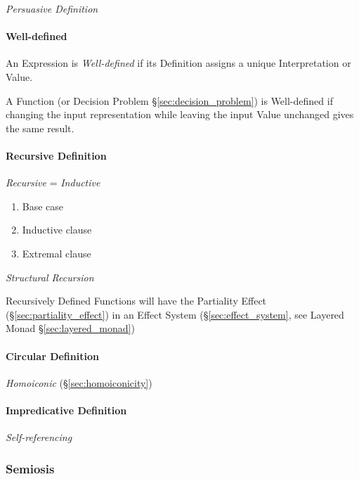 \emph{Persuasive Definition}



\paragraph{Well-defined}\label{sec:well_defined}\hfill

An Expression is \emph{Well-defined} if its Definition assigns a
unique Interpretation or Value.

A Function (or Decision Problem \S\ref{sec:decision_problem}) is
Well-defined if changing the input representation while leaving the
input Value unchanged gives the same result. %



\paragraph{Recursive Definition}\label{sec:recursive_definition}\hfill

\emph{Recursive} = \emph{Inductive}

\begin{enumerate}
    \item Base case
    \item Inductive clause
    \item Extremal clause
\end{enumerate}

\emph{Structural Recursion}

Recursively Defined Functions will have the Partiality Effect
(\S\ref{sec:partiality_effect}) in an Effect System
(\S\ref{sec:effect_system}, see Layered Monad
\S\ref{sec:layered_monad})



\paragraph{Circular Definition}\label{sec:circular_definition}\hfill

\emph{Homoiconic} (\S\ref{sec:homoiconicity})



\paragraph{Impredicative Definition}\label{sec:impredicative_definition}\hfill

\emph{Self-referencing}



\subsubsection{Semiosis}\label{sec:semiosis}

